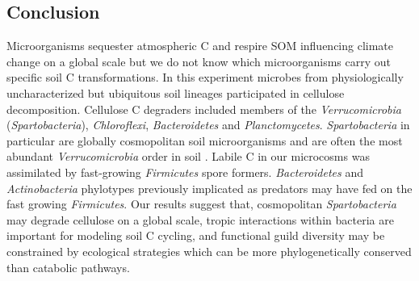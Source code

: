 \subsection{Conclusion} 
Microorganisms sequester atmospheric C and respire SOM influencing climate
change on a global scale but we do not know which microorganisms carry out
specific soil C transformations. In this experiment microbes from
physiologically uncharacterized but ubiquitous soil lineages participated in
cellulose decomposition. Cellulose C degraders included members of the
\textit{Verrucomicrobia} (\textit{Spartobacteria}), \textit{Chloroflexi},
\textit{Bacteroidetes} and \textit{Planctomycetes}. \textit{Spartobacteria} in
particular are globally cosmopolitan soil microorganisms and are often the most
abundant \textit{Verrucomicrobia} order in soil \citep{Bergmann_2011}. Labile
C in our microcosms was assimilated by fast-growing \textit{Firmicutes} spore
formers. \textit{Bacteroidetes} and \textit{Actinobacteria} phylotypes
previously implicated as predators may have fed on the fast growing
\textit{Firmicutes}. Our results suggest that, cosmopolitan
\textit{Spartobacteria} may degrade cellulose on a global scale, tropic
interactions within bacteria are important for modeling soil C cycling, and
functional guild diversity may be constrained by ecological strategies which
can be more phylogenetically conserved than catabolic pathways.

